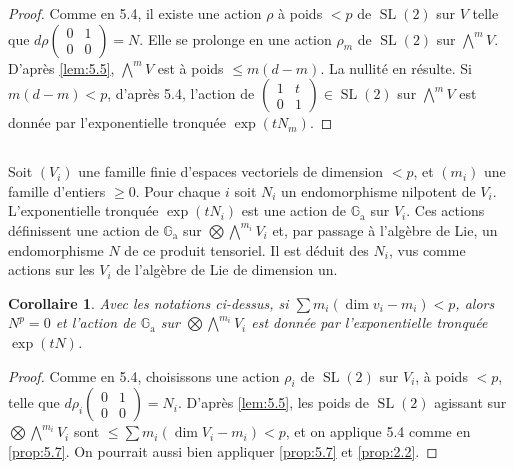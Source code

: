 \documentclass[11pt,a4paper]{article}
\theoremstyle{plain}
\newtheorem{corollary}[theorem]{Corollaire}
\theoremstyle{definition}
\DeclareMathOperator{\SL}{SL}
\newcommand{\Ga}{\mathbb{G}_\mathrm{a}}
\begin{document}
\begin{proof}
Comme en 5.4, il existe une action $\rho$ \`a poids $< p$ de $\SL(2)$ sur $V$ telle que $d\rho \begin{pmatrix} 0 & 1 \\ 0 & 0 \end{pmatrix} = N$. Elle se prolonge en une action $\rho_m$ de $\SL(2)$ sur $\bigwedge^m V$. D'apr\`es \ref{lem:5.5}, $\bigwedge^m V$ est \`a poids $\leq m(d - m)$. La nullit\'e en r\'esulte. Si $m(d - m) < p$, d'apr\`es 5.4, l'action de $\begin{pmatrix} 1 & t \\ 0 & 1 \end{pmatrix} \in \SL(2)$ sur $\bigwedge^m V$ est donn\'ee par l'exponentielle tronqu\'ee $\exp(tN_m)$.
\end{proof}

\subsection{}
Soit $(V_i)$ une famille finie d'espaces vectoriels de dimension $< p$, et $(m_i)$ une famille d'entiers $\geq 0$. Pour chaque $i$ soit $N_i$ un endomorphisme nilpotent de $V_i$. L'exponentielle tronqu\'ee $\exp(tN_i)$ est une action de $\Ga$ sur $V_i$. Ces actions d\'efinissent une action de $\Ga$ sur $\bigotimes \bigwedge^{m_i} V_i$ et, par passage \`a l'alg\`ebre de Lie, un endomorphisme $N$ de ce produit tensoriel. Il est d\'eduit des $N_i$, vus comme actions sur les $V_i$ de l'alg\`ebre de Lie de dimension un.

\begin{corollary}\label{cor:5.9}
Avec les notations ci-dessus, si $\sum m_i(\dim v_i - m_i) < p$, alors $N^p = 0$ et l'action de $\Ga$ sur $\bigotimes \bigwedge^{m_i} V_i$ est donn\'ee par l'exponentielle tronqu\'ee $\exp(tN)$.
\end{corollary}

\begin{proof}
Comme en 5.4, choisissons une action $\rho_i$ de $\SL(2)$ sur $V_i$, \`a poids $< p$, telle que $d\rho_i \begin{pmatrix} 0 & 1 \\ 0 & 0 \end{pmatrix} = N_i$. D'apr\`es \ref{lem:5.5}, les poids de $\SL(2)$ agissant sur $\bigotimes \bigwedge^{m_i} V_i$ sont $\leq \sum m_i(\dim V_i - m_i) < p$, et on applique 5.4 comme en \ref{prop:5.7}. On pourrait aussi bien appliquer \ref{prop:5.7} et \ref{prop:2.2}.
\end{proof}
\end{document}
